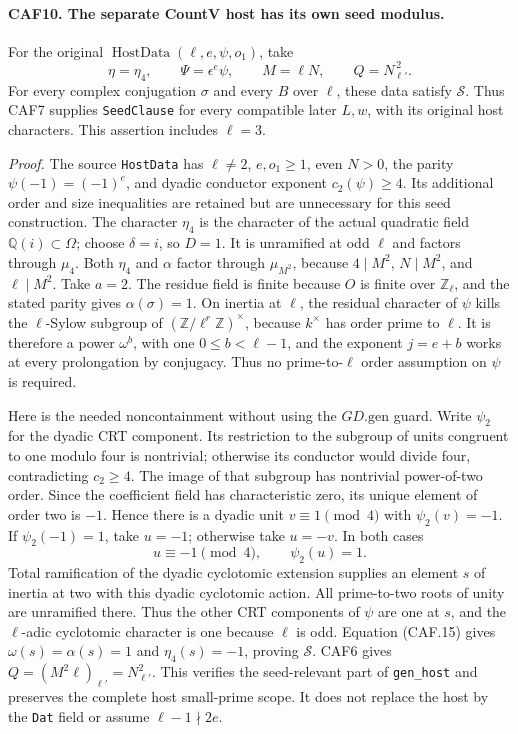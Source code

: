 \documentclass[11pt,a4paper]{article}
\numberwithin{equation}{section}
\theoremstyle{remark}\newtheorem{remark}[theorem]{Remark}
\begin{document}
\paragraph{CAF10. The separate CountV host has its own seed modulus.}
\label{claim:CAF10}
For the original \(\operatorname{HostData}(\ell,e,\psi,o_1)\),
take
\[
 \eta=\eta_4,\qquad \Psi=\epsilon^e\psi,
 \qquad M=\ell N,
 \qquad Q=N_{\ell'}^{\,2}.
 \tag{CAF.14}
\]
For every complex conjugation \(\sigma\) and every \(B\) over
\(\ell\), these data satisfy \(\mathcal S\).  Thus CAF7 supplies
\texttt{Seed\allowbreak Clause} for every compatible later \(L,w\), with its
original host characters.  This assertion includes \(\ell=3\).

\emph{Proof.}
The source \texttt{Host\allowbreak Data} has \(\ell\ne2\), \(e,o_1\ge1\),
even \(N>0\), the parity \(\psi(-1)=(-1)^e\), and dyadic
conductor exponent \(c_2(\psi)\ge4\).  Its additional order and
size inequalities are retained but are unnecessary for this seed
construction.  The character \(\eta_4\) is the character of the
actual quadratic field \(\mathbb Q(i)\subset\Omega\); choose
\(\delta=i\), so \(D=1\).  It is unramified at odd \(\ell\)
and factors through \(\mu_4\).
Both \(\eta_4\) and \(\alpha\) factor through
\(\mu_{M^2}\), because \(4\mid M^2\), \(N\mid M^2\), and
\(\ell\mid M^2\).  Take \(a=2\).
The residue field is finite because \(O\) is finite over
\(\mathbb Z_\ell\), and the stated parity gives
\(\alpha(\sigma)=1\).  On inertia at \(\ell\), the residual
character of \(\psi\) kills the \(\ell\)-Sylow subgroup of
\((\mathbb Z/\ell^r\mathbb Z)^\times\), because \(k^\times\)
has order prime to \(\ell\).  It is therefore a power
\(\omega^b\), with one \(0\le b<\ell-1\), and the exponent
\(j=e+b\) works at every prolongation by conjugacy.  Thus no
prime-to-\(\ell\) order assumption on \(\psi\) is required.

Here is the needed noncontainment without using the
\(GD.\mathrm{gen}\) guard.  Write \(\psi_2\) for the dyadic
CRT component.  Its restriction to the subgroup of units congruent
to one modulo four is nontrivial; otherwise its conductor would
divide four, contradicting \(c_2\ge4\).  The image of that subgroup
has nontrivial power-of-two order.  Since the coefficient field has
characteristic zero, its unique element of order two is \(-1\).
Hence there is a dyadic unit \(v\equiv1\pmod4\) with
\(\psi_2(v)=-1\).  If \(\psi_2(-1)=1\), take \(u=-1\);
otherwise take \(u=-v\).  In both cases
\[
                  u\equiv-1\pmod4,\qquad \psi_2(u)=1.
 \tag{CAF.15}
\]
Total ramification of the dyadic cyclotomic extension supplies an
element \(s\) of inertia at two with this dyadic cyclotomic action.
All prime-to-two roots of unity are unramified there.  Thus the other
CRT components of \(\psi\) are one at \(s\), and the
\(\ell\)-adic cyclotomic character is one because \(\ell\) is odd.
Equation (CAF.15) gives
\(\omega(s)=\alpha(s)=1\) and \(\eta_4(s)=-1\), proving
\(\mathcal S\).  CAF6 gives
\(Q=(M^2\ell)_{\ell'}=N_{\ell'}^2\).
This verifies the seed-relevant part of \texttt{gen\_\allowbreak host} and
preserves the complete host small-prime scope.  It does not replace
the host by the \texttt{Dat} field or assume
\(\ell-1\nmid2e\).
\end{document}
